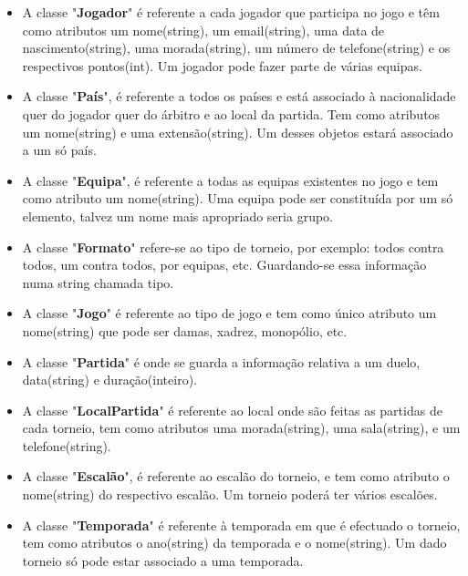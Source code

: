 \documentclass[a4paper]{article}
\begin{document}
\begin{itemize}

\item A classe "\textbf{Jogador}" é referente a cada jogador que participa no jogo e têm como atributos um nome(string), um email(string), uma data de nascimento(string), uma morada(string), um número de telefone(string) e os respectivos pontos(int). Um jogador pode fazer parte de várias equipas.

\item A classe "\textbf{País}", é referente a todos os países e está associado à nacionalidade quer do jogador quer do árbitro e ao local da partida. Tem como atributos um nome(string) e uma extensão(string). Um desses objetos estará associado a um só país.

\item A classe "\textbf{Equipa}", é referente a todas as equipas existentes no jogo e tem como atributo um nome(string). Uma equipa pode ser constituída por um só elemento, talvez um nome mais apropriado seria grupo.

\item A classe "\textbf{Formato}" refere-se ao tipo de torneio, por exemplo: todos contra todos, um contra todos, por equipas, etc. Guardando-se essa informação numa string chamada tipo.

\item A classe "\textbf{Jogo}" é referente ao tipo de jogo e tem como único atributo um nome(string) que pode ser damas, xadrez, monopólio, etc.

\item A classe "\textbf{Partida}" é onde se guarda a informação relativa a um duelo, data(string) e duração(inteiro).

\item A classe "\textbf{LocalPartida}" é referente ao local onde são feitas as partidas de cada torneio, tem como atributos uma morada(string), uma sala(string), e um telefone(string).

\item A classe "\textbf{Escalão}", é referente ao escalão do torneio, e tem como atributo o nome(string) do respectivo escalão. Um torneio poderá ter vários escalões.

\item A classe "\textbf{Temporada}" é referente à temporada em que é efectuado o torneio, tem como atributos o ano(string) da temporada e o nome(string). Um dado torneio só pode estar associado a uma temporada.


\end{itemize}
\end{document}
